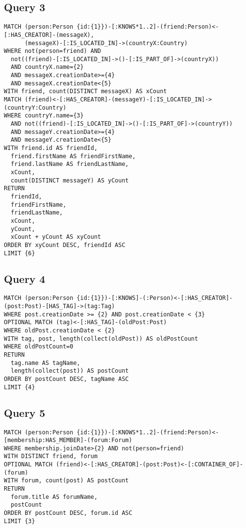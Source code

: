 \subsection{Query 3}

{\footnotesize
\begin{verbatim}
MATCH (person:Person {id:{1}})-[:KNOWS*1..2]-(friend:Person)<-[:HAS_CREATOR]-(messageX),
      (messageX)-[:IS_LOCATED_IN]->(countryX:Country)
WHERE not(person=friend) AND 
  not((friend)-[:IS_LOCATED_IN]->()-[:IS_PART_OF]->(countryX)) 
  AND countryX.name={2} 
  AND messageX.creationDate>={4} 
  AND messageX.creationDate<{5}
WITH friend, count(DISTINCT messageX) AS xCount
MATCH (friend)<-[:HAS_CREATOR]-(messageY)-[:IS_LOCATED_IN]->(countryY:Country)
WHERE countryY.name={3} 
  AND not((friend)-[:IS_LOCATED_IN]->()-[:IS_PART_OF]->(countryY)) 
  AND messageY.creationDate>={4} 
  AND messageY.creationDate<{5}
WITH friend.id AS friendId, 
  friend.firstName AS friendFirstName, 
  friend.lastName AS friendLastName, 
  xCount, 
  count(DISTINCT messageY) AS yCount
RETURN 
  friendId, 
  friendFirstName, 
  friendLastName, 
  xCount, 
  yCount, 
  xCount + yCount AS xyCount
ORDER BY xyCount DESC, friendId ASC
LIMIT {6}
\end{verbatim}
}

\subsection{Query 4}

{\footnotesize
\begin{verbatim}
MATCH (person:Person {id:{1}})-[:KNOWS]-(:Person)<-[:HAS_CREATOR]-(post:Post)-[HAS_TAG]->(tag:Tag)
WHERE post.creationDate >= {2} AND post.creationDate < {3}
OPTIONAL MATCH (tag)<-[:HAS_TAG]-(oldPost:Post)
WHERE oldPost.creationDate < {2}
WITH tag, post, length(collect(oldPost)) AS oldPostCount
WHERE oldPostCount=0
RETURN 
  tag.name AS tagName, 
  length(collect(post)) AS postCount
ORDER BY postCount DESC, tagName ASC
LIMIT {4}
\end{verbatim}
}

\subsection{Query 5}

{\footnotesize
\begin{verbatim}
MATCH (person:Person {id:{1}})-[:KNOWS*1..2]-(friend:Person)<-[membership:HAS_MEMBER]-(forum:Forum)
WHERE membership.joinDate>{2} AND not(person=friend)
WITH DISTINCT friend, forum
OPTIONAL MATCH (friend)<-[:HAS_CREATOR]-(post:Post)<-[:CONTAINER_OF]-(forum)
WITH forum, count(post) AS postCount
RETURN 
  forum.title AS forumName, 
  postCount
ORDER BY postCount DESC, forum.id ASC
LIMIT {3}
\end{verbatim}
}


